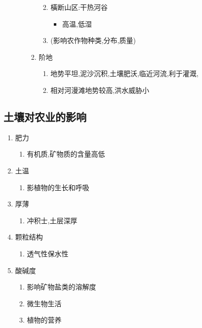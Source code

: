 \documentclass[a4paper]{article}
\begin{document}
\begin{enumerate}
\begin{enumerate}
\begin{enumerate}
\begin{enumerate}
\begin{itemize}
                    \end{itemize}
                    \item 橫断山区:干热河谷
                    \begin{itemize}
                        \item 高温,低湿
                    \end{itemize}
                    \item (影响农作物种类,分布,质量)
                \end{enumerate}
                \item 阶地
                \begin{enumerate}
                    \item 地势平坦,泥沙沉积,土壤肥沃,临近河流,利于灌溉,
                    \item 相对河漫滩地势较高,洪水威胁小
                \end{enumerate}
            \end{enumerate}
        \end{enumerate}
    \end{enumerate}
    \subsection{土壤对农业的影响}
    \begin{enumerate}
        \item 肥力
        \begin{enumerate}
            \item 有机质,矿物质的含量高低
        \end{enumerate}
        \item 土温
        \begin{enumerate}
            \item 影植物的生长和呼吸
        \end{enumerate}
        \item 厚薄
        \begin{enumerate}
            \item 冲积士,土层深厚
        \end{enumerate}
        \item 颗粒结构
        \begin{enumerate}
            \item 透气性保水性
        \end{enumerate}
        \item 酸碱度
        \begin{enumerate}
            \item 影响矿物盐类的溶解度
            \item 微生物生活
            \item 植物的营养
        \end{enumerate}
    \end{enumerate}
\end{document}
